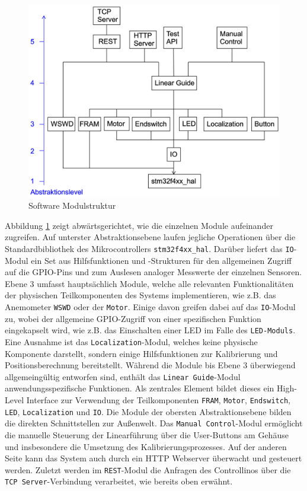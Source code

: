 \begin{figure}[h]
	\centering
	\includegraphics[width=0.6\linewidth]{images/Software/Modulestructure.png}
	\caption{Software Modulstruktur}
	\label{fig:modulestructure}
\end{figure}
\noindent
Abbildung \ref{fig:modulestructure} zeigt abwärtsgerichtet, wie die einzelnen Module aufeinander zugreifen. Auf unterster Abstraktionsebene laufen jegliche Operationen über die Standardbibliothek des Mikrocontrollers \texttt{stm32f4xx\_hal}. Darüber liefert das \texttt{IO}-Modul ein Set aus Hilfsfunktionen und -Strukturen für den allgemeinen Zugriff auf die GPIO-Pins und zum Auslesen analoger Messwerte der einzelnen Sensoren. Ebene 3 umfasst hauptsächlich Module, welche alle relevanten Funktionalitäten der physischen Teilkomponenten des Systems implementieren, wie z.B. das Anemometer \texttt{WSWD} oder der \texttt{Motor}. Einige davon greifen dabei auf das \texttt{IO}-Modul zu, wobei der allgemeine GPIO-Zugriff von einer spezifischen Funktion eingekapselt wird, wie z.B. das Einschalten einer LED im Falle des \texttt{LED-Moduls}. Eine Ausnahme ist das \texttt{Localization}-Modul, welches keine physische Komponente darstellt, sondern einige Hilfsfunktionen zur Kalibrierung und Positionsberechnung bereitstellt. Während die Module bis Ebene 3 überwiegend allgemeingültig entworfen sind, enthält das \texttt{Linear Guide}-Modul anwendungsspezifische Funktionen. Als zentrales Element bildet dieses ein High-Level Interface zur Verwendung der Teilkomponenten \texttt{FRAM}, \texttt{Motor}, \texttt{Endswitch}, \texttt{LED}, \texttt{Localization} und \texttt{IO}. Die Module der obersten Abstraktionsebene bilden die direkten Schnittstellen zur Außenwelt. Das \texttt{Manual Control}-Modul ermöglicht die manuelle Steuerung der Linearführung über die User-Buttons am Gehäuse und insbesondere die Umsetzung des Kalibrierungsprozesses. Auf der anderen Seite kann das System auch durch ein HTTP Webserver überwacht und gesteuert werden. Zuletzt werden im \texttt{REST}-Modul die Anfragen des Controllinos über die \texttt{TCP Server}-Verbindung verarbeitet, wie bereits oben erwähnt.
